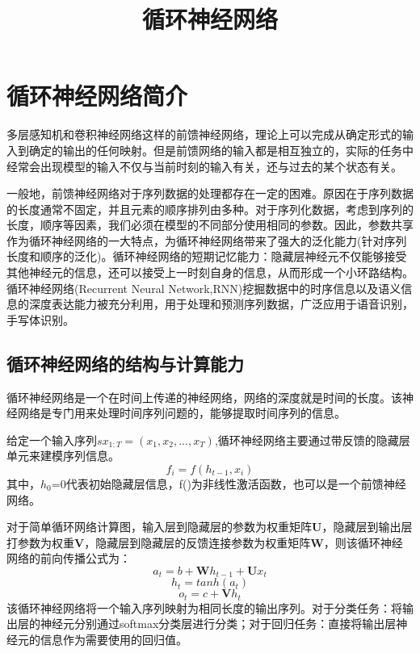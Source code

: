 \documentclass[openbib]{article}
\begin{document}
	\title{循环神经网络}
	
	
	\maketitle
	
	\newpage
	\tableofcontents
	\newpage
\section{循环神经网络简介}
多层感知机和卷积神经网络这样的前馈神经网络，理论上可以完成从确定形式的输入到确定的输出的任何映射。但是前馈网络的输入都是相互独立的，实际的任务中经常会出现模型的输入不仅与当前时刻的输入有关，还与过去的某个状态有关。

一般地，前馈神经网络对于序列数据的处理都存在一定的困难。原因在于序列数据的长度通常不固定，并且元素的顺序排列由多种。对于序列化数据，考虑到序列的长度，顺序等因素，我们必须在模型的不同部分使用相同的参数。因此，参数共享作为循环神经网络的一大特点，为循环神经网络带来了强大的泛化能力(针对序列长度和顺序的泛化)。循环神经网络的短期记忆能力：隐藏层神经元不仅能够接受其他神经元的信息，还可以接受上一时刻自身的信息，从而形成一个小环路结构。循环神经网络(Recurrent Neural Network,RNN)挖掘数据中的时序信息以及语义信息的深度表达能力被充分利用，用于处理和预测序列数据，广泛应用于语音识别，手写体识别。
\subsection{循环神经网络的结构与计算能力}
循环神经网络是一个在时间上传递的神经网络，网络的深度就是时间的长度。该神经网络是专门用来处理时间序列问题的，能够提取时间序列的信息。

给定一个输入序列$sx_{1:T} = (x_1,x_2,...,x_T)$,循环神经网络主要通过带反馈的隐藏层单元来建模序列信息。$$f_i=f(h_{t-1},x_i)$$
其中，$h_0$=0代表初始隐藏层信息，f()为非线性激活函数，也可以是一个前馈神经网络。

对于简单循环网络计算图，输入层到隐藏层的参数为权重矩阵\textbf{U}，隐藏层到输出层打参数为权重\textbf{V}，隐藏层到隐藏层的反馈连接参数为权重矩阵\textbf{W}，则该循环神经网络的前向传播公式为：
$$a_t = b+\textbf{W}h_{t-1}+\textbf{U}x_t$$
$$h_t = tanh(a_t)$$
$$o_t = c + \textbf{V}h_t$$
该循环神经网络将一个输入序列映射为相同长度的输出序列。对于分类任务：将输出层的神经元分别通过softmax分类层进行分类；对于回归任务：直接将输出层神经元的信息作为需要使用的回归值。
\end{document}
